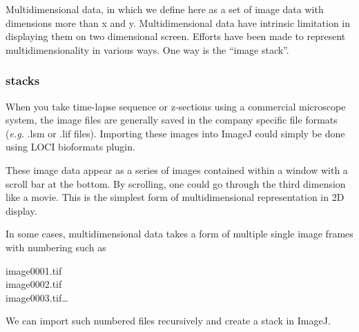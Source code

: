 Multidimensional data, in which we define here as a set of image data with dimensions more than x and y. Multidimensional data have intrinsic limitation in displaying them on two dimensional screen. Efforts have been made to represent multidimensionality in various ways. One way is the ``image stack''.

\subsubsection{stacks}
When you take time-lapse sequence or z-sections using a commercial microscope system, the image files are generally saved in the company specific file formats (\textit{e.g.} .lsm or .lif files). Importing these images into ImageJ could simply be done using LOCI bioformats plugin. 

These image data appear as a series of images contained within a window with a scroll bar at the bottom. By scrolling, one could go through the third dimension like a movie. This is the simplest form of multidimensional representation in 2D display. 

In some cases, multidimensional data takes a form of multiple
single image frames with numbering such as 


image0001.tif\\
image0002.tif\\
image0003.tif\dots

We can import such numbered files recursively and create a stack in ImageJ. 

